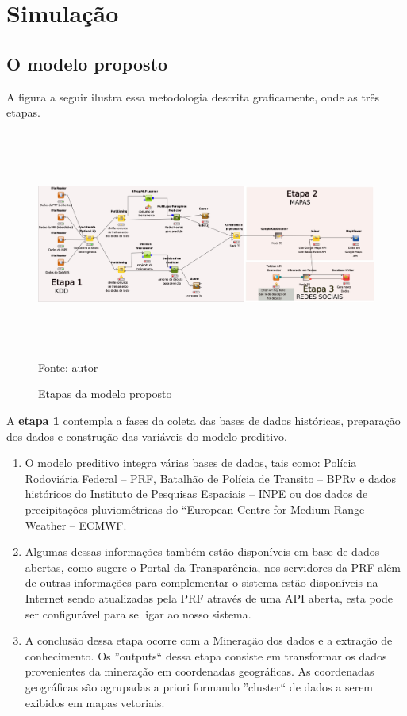 \chapter{Simulação}\label{simula}


\section{O modelo proposto}

A figura a seguir ilustra essa metodologia descrita graficamente, onde as três etapas.

\begin{figure}[ht]
\centering
\caption{Etapas da modelo proposto}
\includegraphics[width=175mm, height=75mm]{Figuras/Cronograma/metodologia.png}\\
\tiny Fonte: autor
\end{figure}

A \textbf{etapa 1} contempla a fases da coleta das bases de dados históricas, preparação dos dados e construção das variáveis do modelo preditivo.
  \begin{enumerate}
    \item O modelo preditivo integra várias bases de dados, tais como: Polícia Rodoviária Federal -- PRF, Batalhão de Polícia de Transito -- BPRv e dados históricos 
	   do Instituto de Pesquisas Espaciais -- INPE ou dos dados de precipitações pluviométricas do ``European Centre for Medium-Range Weather -- ECMWF.
 
    \item Algumas dessas informações também estão disponíveis em base de dados abertas, como sugere o Portal da Transparência, nos servidores da PRF além de outras
	  informações para complementar o sistema estão disponíveis na Internet sendo atualizadas pela PRF através de uma API aberta, esta pode 
	  ser configurável para se ligar ao nosso sistema.
    \item A conclusão dessa etapa ocorre com a Mineração dos dados e a extração de conhecimento.
	  Os ''outputs`` dessa etapa consiste em transformar os dados provenientes da mineração em coordenadas geográficas. 
	  As coordenadas geográficas são agrupadas a priori formando ''cluster`` de dados a serem exibidos em mapas vetoriais.\\
\end{enumerate}
  
